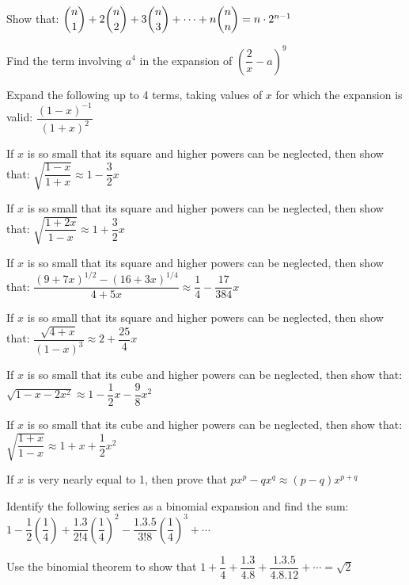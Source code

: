 \documentclass[11pt,a4paper]{article}
\begin{document}
\begin{longlist}
\item Show that: $\dbinom{n}{1}+2\dbinom{n}{2}+3\dbinom{n}{3}+\cdots+n\dbinom{n}{n}=n\cdot 2^{n-1}$

\item Find the term involving $a^4$ in the expansion of $\left(\dfrac{2}{x}-a\right)^9$

\item Expand the following up to 4 terms, taking values of $x$ for which the expansion is valid: $\dfrac{(1-x)^{-1}}{(1+x)^2}$

\item If $x$ is so small that its square and higher powers can be neglected, then show that: $\sqrt{\dfrac{1-x}{1+x}}\approx 1-\dfrac{3}{2}x$

\item If $x$ is so small that its square and higher powers can be neglected, then show that: $\sqrt{\dfrac{1+2x}{1-x}}\approx 1+\dfrac{3}{2}x$

\item If $x$ is so small that its square and higher powers can be neglected, then show that: $\dfrac{(9+7x)^{1/2}-(16+3x)^{1/4}}{4+5x}\approx \dfrac{1}{4}-\dfrac{17}{384}x$

\item If $x$ is so small that its square and higher powers can be neglected, then show that: $\dfrac{\sqrt{4+x}}{(1-x)^3}\approx 2+\dfrac{25}{4}x$

\item If $x$ is so small that its cube and higher powers can be neglected, then show that: $\sqrt{1-x-2x^2}\approx 1-\dfrac{1}{2}x-\dfrac{9}{8}x^2$

\item If $x$ is so small that its cube and higher powers can be neglected, then show that: $\sqrt{\dfrac{1+x}{1-x}}\approx 1+x+\dfrac{1}{2}x^2$

\item If $x$ is very nearly equal to 1, then prove that $px^p-qx^q\approx (p-q)x^{p+q}$

\item Identify the following series as a binomial expansion and find the sum: $1-\dfrac{1}{2}\left(\dfrac{1}{4}\right)+\dfrac{1.3}{2!4}\left(\dfrac{1}{4}\right)^2-\dfrac{1.3.5}{3!8}\left(\dfrac{1}{4}\right)^3+\cdots$

\item Use the binomial theorem to show that $1+\dfrac{1}{4}+\dfrac{1.3}{4.8}+\dfrac{1.3.5}{4.8.12}+\cdots=\sqrt{2}$


\end{longlist}
\end{document}
